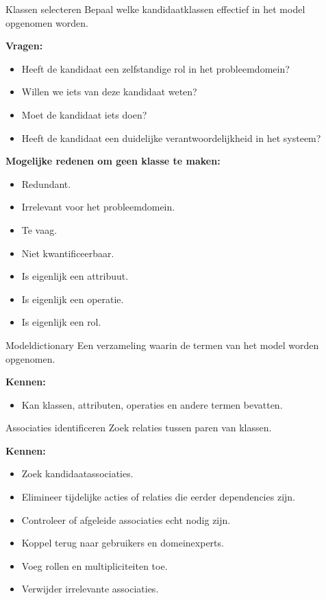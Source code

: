 \documentclass[11pt,a4paper]{article}
\begin{document}
\begin{definition}{Klassen selecteren}
Bepaal welke kandidaatklassen effectief in het model opgenomen worden.

\textbf{Vragen:}
\begin{itemize}
    \item Heeft de kandidaat een zelfstandige rol in het probleemdomein?
    \item Willen we iets van deze kandidaat weten?
    \item Moet de kandidaat iets doen?
    \item Heeft de kandidaat een duidelijke verantwoordelijkheid in het systeem?
\end{itemize}

\textbf{Mogelijke redenen om geen klasse te maken:}
\begin{itemize}
    \item Redundant.
    \item Irrelevant voor het probleemdomein.
    \item Te vaag.
    \item Niet kwantificeerbaar.
    \item Is eigenlijk een attribuut.
    \item Is eigenlijk een operatie.
    \item Is eigenlijk een rol.
\end{itemize}
\end{definition}

\begin{definition}{Modeldictionary}
Een verzameling waarin de termen van het model worden opgenomen.

\textbf{Kennen:}
\begin{itemize}
    \item Kan klassen, attributen, operaties en andere termen bevatten.
\end{itemize}
\end{definition}

\begin{definition}{Associaties identificeren}
Zoek relaties tussen paren van klassen.

\textbf{Kennen:}
\begin{itemize}
    \item Zoek kandidaatassociaties.
    \item Elimineer tijdelijke acties of relaties die eerder dependencies zijn.
    \item Controleer of afgeleide associaties echt nodig zijn.
    \item Koppel terug naar gebruikers en domeinexperts.
    \item Voeg rollen en multipliciteiten toe.
    \item Verwijder irrelevante associaties.
\end{itemize}
\end{definition}
\end{document}
